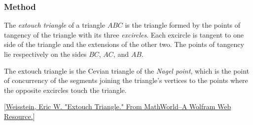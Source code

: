 \vspace{1em}

\begin{minipage}{.5\textwidth}
\end{minipage}
\begin{minipage}{.5\textwidth}
\begin{tkzexample}
\end{tkzexample}
\end{minipage}




\subsubsection{Method } %
\label{ssub:method_triangle_extouch}

The \emph{extouch triangle} of a triangle $ABC$ is the triangle formed by the points of tangency of the triangle with its three \emph{excircles}. Each excircle is tangent to one side of the triangle and the extensions of the other two. The points of tangency lie respectively on the sides $BC$, $AC$, and $AB$.

The extouch triangle is the Cevian triangle of the \emph{Nagel point}, which is the point of concurrency of the segments joining the triangle's vertices to the points where the opposite excircles touch the triangle.

\begin{flushright}
  \small
[\href{https://mathworld.wolfram.com/ExtouchTriangle.html}{Weisstein, Eric W. "Extouch Triangle." From MathWorld--A Wolfram Web Resource.}]
\end{flushright}

